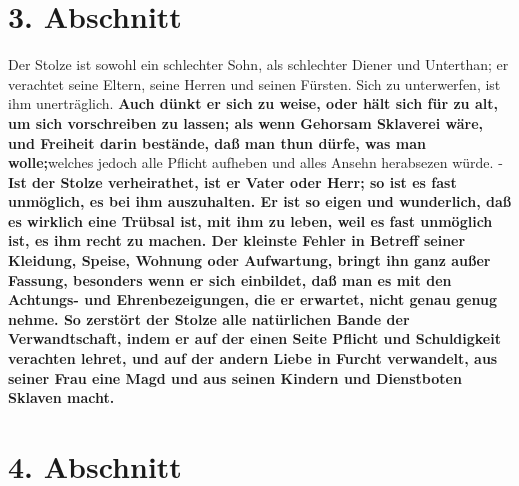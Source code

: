 \section{3. Abschnitt} \label{kap12_ab3}

Der Stolze ist sowohl ein schlechter Sohn, als schlechter
Diener und Unterthan;
er verachtet seine Eltern, seine Herren und seinen Fürsten. Sich
zu unterwerfen,
ist ihm unerträglich. \textbf{Auch dünkt er sich zu weise, oder hält sich für zu
alt, um
sich vorschreiben zu lassen; als wenn Gehorsam Sklaverei wäre,
und Freiheit
darin bestände, daß man thun dürfe, was man wolle;}welches jedoch alle Pflicht
aufheben und alles Ansehn herabsezen würde. - \textbf{Ist der Stolze
verheirathet, ist
er Vater oder Herr; so ist es fast unmöglich, es bei ihm auszuhalten. Er ist so
eigen und wunderlich, daß es wirklich eine Trübsal ist, mit ihm zu leben, weil
es fast unmöglich ist, es ihm recht zu machen. Der kleinste Fehler in Betreff
seiner Kleidung, Speise, Wohnung oder Aufwartung, bringt ihn ganz außer Fassung,
besonders wenn er sich einbildet, daß man es mit den Achtungs- und
Ehrenbezeigungen, die er erwartet, nicht genau genug nehme. So zerstört der
Stolze alle natürlichen Bande der Verwandtschaft, indem er
auf der einen Seite
Pflicht und Schuldigkeit verachten lehret, und auf der andern
Liebe in Furcht
verwandelt, aus seiner Frau eine Magd und aus seinen
Kindern und Dienstboten
Sklaven macht.}

\section{4. Abschnitt} \label{kap12_ab4}

